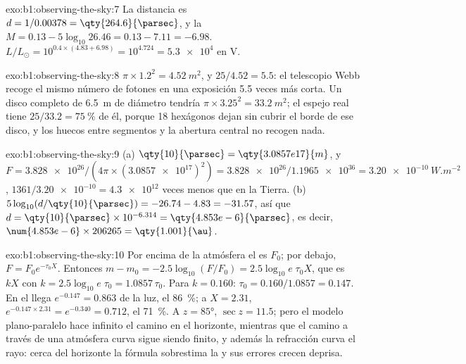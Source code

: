 \begin{solution}{exo:b1:observing-the-sky:7}
La distancia es $d = 1/0.00378 = \qty{264.6}{\parsec}$, y la 
$M = 0.13 - 5\log_{10}26.46 = 0.13 - 7.11 = -6.98$. $L/L_\odot = 10^{0.4\times(4.83 + 6.98)} =
10^{4.724} = \num{5.3e4}$ en V.
\end{solution}

\begin{solution}{exo:b1:observing-the-sky:8}
$\pi\times1.2^2 = \qty{4.52}{m^2}$, y $25/4.52 = 5.5$: el telescopio Webb recoge el mismo
número de fotones en una exposición 5.5 veces más corta. Un disco completo de
\qty{6.5}{m} de diámetro tendría $\pi\times3.25^2 = \qty{33.2}{m^2}$; el espejo real tiene
$25/33.2 = \qty{75}{\percent}$ de él, porque 18 hexágonos dejan sin cubrir el borde de ese
disco, y los huecos entre segmentos y la abertura central no recogen nada.
\end{solution}

\begin{solution}{exo:b1:observing-the-sky:9}
(a) $\qty{10}{\parsec} = \qty{3.0857e17}{m}$, y $F = \num{3.828e26}/(4\pi
\times(\num{3.0857e17})^2) = \num{3.828e26}/\num{1.1965e36} =
\qty{3.20e-10}{W.m^{-2}}$, $1361/\num{3.20e-10} = \num{4.3e12}$ veces menos que en la Tierra.
(b) $5\log_{10}(d/\qty{10}{\parsec}) = -26.74 - 4.83 = -31.57$, así que
$d = \qty{10}{\parsec}\times10^{-6.314} = \qty{4.853e-6}{\parsec}$, es decir,
$\num{4.853e-6}\times206265 = \qty{1.001}{\au}$.
\end{solution}

\begin{solution}{exo:b1:observing-the-sky:10}
Por encima de la atmósfera el  es $F_0$; por debajo, $F = F_0e^{-\tau_0X}$. Entonces
$m - m_0 = -2.5\log_{10}(F/F_0) = 2.5\log_{10}e\;\tau_0X$, que es $kX$ con
$k = 2.5\log_{10}e\;\tau_0 = 1.0857\,\tau_0$. Para $k = 0.160$:
$\tau_0 = 0.160/1.0857 = 0.147$. En el  llega $e^{-0.147} = 0.863$ de la luz, el
\qty{86}{\percent}; a $X = 2.31$, $e^{-0.147\times2.31} =
e^{-0.340} = 0.712$, el \qty{71}{\percent}. A $z = \ang{85}$, $\sec z =
11.5$; pero el modelo plano-paralelo hace infinito el camino en el horizonte, mientras que el
camino a través de una atmósfera curva sigue siendo finito, y además la refracción curva el
rayo: cerca del horizonte la fórmula sobrestima la  y sus errores crecen deprisa.
\end{solution}

